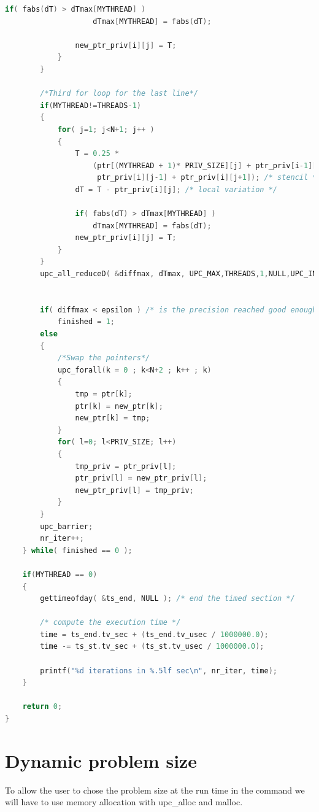 \documentclass{report}
\begin{document}
\begin{lstlisting}[language=c]
                if( fabs(dT) > dTmax[MYTHREAD] )
                    dTmax[MYTHREAD] = fabs(dT);
    
                new_ptr_priv[i][j] = T;
            }
        }

        /*Third for loop for the last line*/
        if(MYTHREAD!=THREADS-1)
        {
            for( j=1; j<N+1; j++ )
            {
                T = 0.25 *
                    (ptr[(MYTHREAD + 1)* PRIV_SIZE][j] + ptr_priv[i-1][j] +
                     ptr_priv[i][j-1] + ptr_priv[i][j+1]); /* stencil */
                dT = T - ptr_priv[i][j]; /* local variation */

                if( fabs(dT) > dTmax[MYTHREAD] )
                    dTmax[MYTHREAD] = fabs(dT);
                new_ptr_priv[i][j] = T;
            }
        }
        upc_all_reduceD( &diffmax, dTmax, UPC_MAX,THREADS,1,NULL,UPC_IN_ALLSYNC | UPC_OUT_ALLSYNC);

        
        if( diffmax < epsilon ) /* is the precision reached good enough ? */
            finished = 1;
        else
        {
            /*Swap the pointers*/
            upc_forall(k = 0 ; k<N+2 ; k++ ; k)   
            {   
                tmp = ptr[k];
                ptr[k] = new_ptr[k];
                new_ptr[k] = tmp;  
            }
            for( l=0; l<PRIV_SIZE; l++)
            {
                tmp_priv = ptr_priv[l];
                ptr_priv[l] = new_ptr_priv[l];
                new_ptr_priv[l] = tmp_priv;
            }
        }
        upc_barrier;
        nr_iter++;
    } while( finished == 0 );

    if(MYTHREAD == 0)
    {
        gettimeofday( &ts_end, NULL ); /* end the timed section */

        /* compute the execution time */
        time = ts_end.tv_sec + (ts_end.tv_usec / 1000000.0);
        time -= ts_st.tv_sec + (ts_st.tv_usec / 1000000.0);

        printf("%d iterations in %.5lf sec\n", nr_iter, time);
    }
    
    return 0;
}
\end{lstlisting}

\section{Dynamic problem size}

To allow the user to chose the problem size at the run time in the command we will have to use memory allocation with upc\_alloc and malloc.
\end{document}
